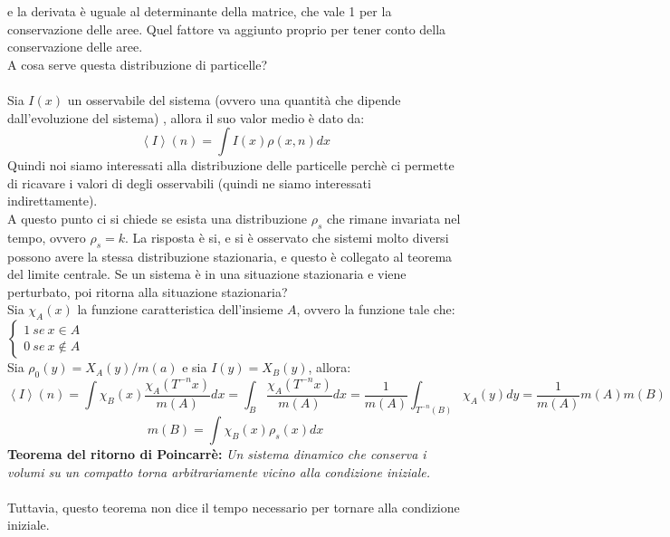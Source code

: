 \documentclass[12pt]{article}
\newcommand{\lang}{\left\langle}
\newcommand{\rang}{\right\rangle}
\begin{document}
e la derivata è uguale al determinante della matrice, che vale 1 per la conservazione delle aree. Quel fattore va aggiunto proprio per tener conto della conservazione delle aree.\\ A cosa serve questa distribuzione di particelle? \\ \\
Sia $I(x)$ un osservabile del sistema (ovvero una quantità che dipende dall'evoluzione del sistema) , allora il suo valor medio è dato da:
$$
	\lang I \rang (n) = \int I(x) \rho(x,n)dx
$$
Quindi noi siamo interessati alla distribuzione delle particelle perchè ci permette di ricavare i valori di degli osservabili (quindi ne siamo interessati indirettamente). \\
A questo punto ci si chiede se esista una distribuzione $\rho_s$ che rimane invariata nel tempo, ovvero $\rho_s = k$. La risposta è si, e si è osservato che sistemi molto diversi possono avere la stessa distribuzione stazionaria, e questo è collegato al teorema del limite centrale. Se un sistema è in una situazione stazionaria e viene perturbato, poi ritorna alla situazione stazionaria?\\
Sia $\chi_A(x)$ la funzione caratteristica dell'insieme $A$, ovvero la funzione tale che: $
\begin{cases}
1 \ se \ x \in A \\
0 \ se \ x \not\in A
\end{cases}
$ \\
Sia $\rho_0(y) = X_A(y)/m(a)$ e sia $I(y) = X_B(y)$, allora:
$$
	\lang I \rang (n) = \int \chi_B(x) \frac{\chi_A(T^{-n}x)}{m(A)} dx = \int_B \frac{\chi_A(T^{-n}x)}{m(A)}dx = \frac{1}{m(A)} \int_{T^{-n}(B)}\chi_A(y)dy = \frac{1}{m(A)}m(A)m(B)
$$
$$
	m(B) = \int \chi_B(x)\rho_s(x)dx
$$
\textbf{Teorema del ritorno di Poincarrè:} \textit{Un sistema dinamico che conserva i volumi su un compatto torna arbitrariamente vicino alla condizione iniziale.} \\ \\
Tuttavia, questo teorema non dice il tempo necessario per tornare alla condizione iniziale. \\ \\ \\
\end{document}
